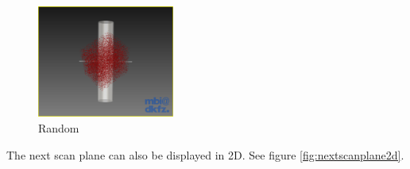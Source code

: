 \begin{figure}[H]
  \centering
  \includegraphics[width=0.4\textwidth]{images/next_scan_plane/random.png}
  \caption{Random}\label{fig:nextscanplanerandom}
\end{figure}

\newpage
The next scan plane can also be displayed in 2D. See figure \ref{fig:nextscanplane2d}.

